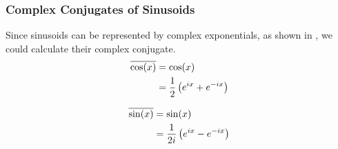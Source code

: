 \subsubsection{Complex Conjugates of Sinusoids}\label{app:Sinusoid_Complex_Conjugates}
Since sinusoids can be represented by complex exponentials, as shown in , we could calculate their complex conjugate.
\begin{equation}\label{eq:Sinusoid_Complex_Conjugate-Cosine}
  \begin{aligned}
    \overline{\cos(x)} &= \cos(x) \\
    &= \frac{1}{2} \left( e^{ix} + e^{-ix} \right) \\
  \end{aligned}
\end{equation}

\begin{equation}\label{eq:Sinusoid_Complex_Conjugate-Sine}
  \begin{aligned}
    \overline{\sin(x)} &= \sin(x) \\
    &= \frac{1}{2i} \left( e^{ix} - e^{-ix} \right) \\
  \end{aligned}
\end{equation}

